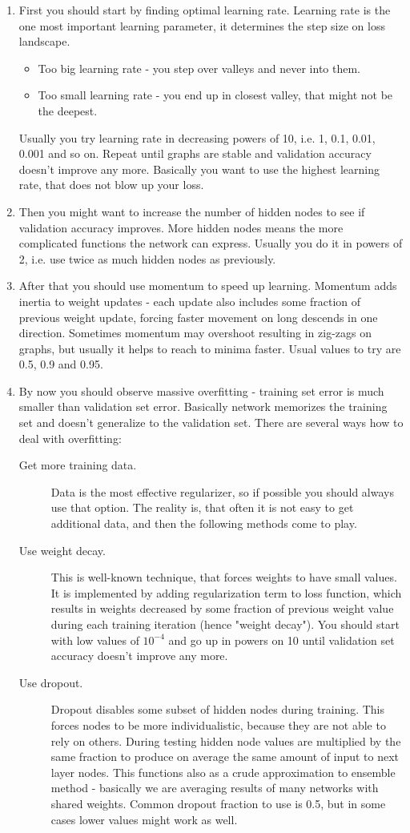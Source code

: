 \documentclass[a4paper,11pt]{article}
\begin{document}
\begin{enumerate}
	\item First you should start by finding optimal learning rate. Learning rate is the one most important learning parameter, it determines the step size on loss landscape. 
	\begin{itemize}	
		\item Too big learning rate - you step over valleys and never into them. 
		\item Too small learning rate - you end up in closest valley, that might not be the deepest. 
	\end{itemize}
	Usually you try learning rate in decreasing powers of 10, i.e. 1, 0.1, 0.01, 0.001 and so on. Repeat  until graphs are stable and validation accuracy doesn't improve any more. Basically you want to use the highest learning rate, that does not blow up your loss.
	\item Then you might want to increase the number of hidden nodes to see if validation accuracy improves. More hidden nodes means the more complicated functions the network can express. Usually you do it in powers of 2, i.e. use twice as much hidden nodes as previously.
	\item After that you should use momentum to speed up learning. Momentum adds inertia to weight updates - each update also includes some fraction of previous weight update, forcing faster movement on long descends in one direction. Sometimes momentum may overshoot resulting in zig-zags on graphs, but usually it helps to reach to minima faster. Usual values to try are 0.5, 0.9 and 0.95.
	\item By now you should observe massive overfitting - training set error is much smaller than validation set error. Basically network memorizes the training set and doesn't generalize to the validation set. There are several ways how to deal with overfitting:
	\begin{description}
		\item[Get more training data.] Data is the most effective regularizer, so if possible you should always use that option. The reality is, that often it is not easy to get additional data, and then the following methods come to play.
		\item[Use weight decay.] This is well-known technique, that forces weights to have small values. It is implemented by adding regularization term to loss function, which results in weights decreased by some fraction of previous weight value during each training iteration (hence "weight decay"). You should start with low values of $10^{-4}$ and go up in powers on 10 until validation set accuracy doesn't improve any more.
		\item[Use dropout.] Dropout disables some subset of hidden nodes during training. This forces nodes to be more individualistic, because they are not able to rely on others. During testing hidden node values are multiplied by the same fraction to produce on average the same amount of input to next layer nodes. This functions also as a crude approximation to ensemble method - basically we are averaging results of many networks with shared weights. Common dropout fraction to use is 0.5, but in some cases lower values might work as well.


\end{description}
\end{enumerate}
\end{document}
